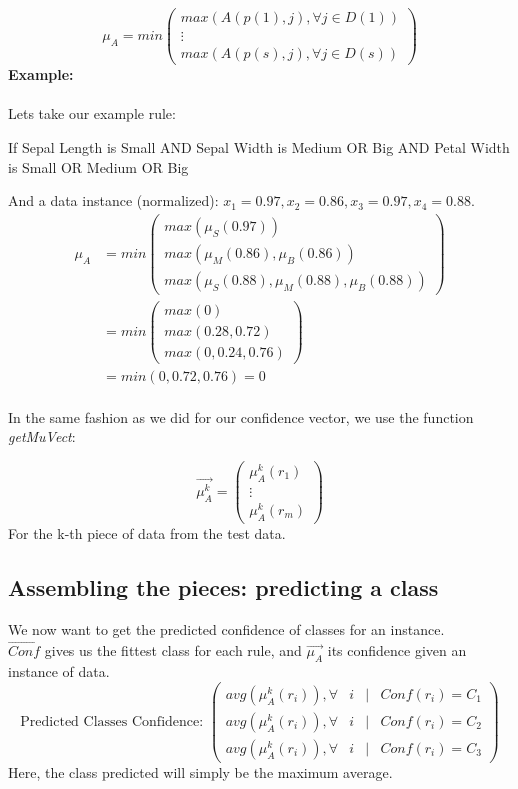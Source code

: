 \documentclass[a4paper,12pt]{article}
\begin{document}
\[\mu_A=
min
\begin{pmatrix}
max(A(p(1),j),\forall j \in D(1))\\
\vdots \\
max(A(p(s),j),\forall j \in D(s))
\end{pmatrix}
    \]
\textbf{Example:}\\
\\
Lets take our example rule:
\begin{center}
If Sepal Length is Small AND Sepal Width is Medium OR Big AND Petal Width is Small OR Medium OR Big
\end{center}
And a data instance (normalized): $x_1=0.97,x_2=0.86,x_3=0.97,x_4=0.88$.\\
\[
\begin{split}
\mu_A &= min
\begin{pmatrix}
max(\mu_S(0.97))\\
max(\mu_M(0.86),\mu_B(0.86))\\
max(\mu_S(0.88),\mu_M(0.88),\mu_B(0.88))
\end{pmatrix}\\
&= min
\begin{pmatrix}
max(0)\\
max(0.28,0.72)\\
max(0,0.24,0.76)
\end{pmatrix}\\
&= min(0,0.72,0.76) = 0
\end{split}
\]
\\

In the same fashion as we did for our confidence vector, we use the function \textit{getMuVect}:

\[
\vec{\mu_A^k}=
\begin{pmatrix}
\mu_A^k(r_1)\\
\vdots\\
\mu_A^k(r_m)
\end{pmatrix}
\]
For the k-th piece of data from the test data.

\subsection{Assembling the pieces: predicting a class}

We now want to get the predicted confidence of classes for an instance.\\
$\vec{Conf}$ gives us the fittest class for each rule, and $\vec{\mu_A}$ its confidence given an instance of data.
\[
\text{Predicted Classes Confidence: }
\begin{pmatrix}
avg(\mu_A^k(r_i)), \forall & i & | & Conf(r_i)=C_1\\
avg(\mu_A^k(r_i)), \forall & i & | & Conf(r_i)=C_2\\
avg(\mu_A^k(r_i)), \forall & i & | & Conf(r_i)=C_3
\end{pmatrix}
\]
Here, the class predicted will simply be the maximum average.
\end{document}
